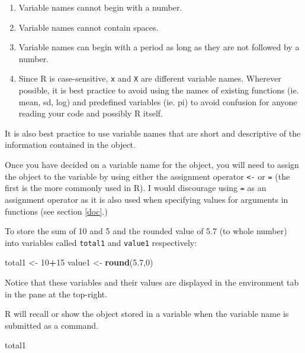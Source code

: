 \documentclass[
]{book}
\newenvironment{Shaded}{\begin{snugshade}}{\end{snugshade}}
\newcommand{\DecValTok}[1]{\textcolor[rgb]{0.00,0.00,0.81}{#1}}
\newcommand{\FloatTok}[1]{\textcolor[rgb]{0.00,0.00,0.81}{#1}}
\newcommand{\FunctionTok}[1]{\textcolor[rgb]{0.13,0.29,0.53}{\textbf{#1}}}
\newcommand{\NormalTok}[1]{#1}
\newcommand{\OtherTok}[1]{\textcolor[rgb]{0.56,0.35,0.01}{#1}}
\newcommand{\SpecialCharTok}[1]{\textcolor[rgb]{0.81,0.36,0.00}{\textbf{#1}}}
\providecommand{\tightlist}{%
  \setlength{\itemsep}{0pt}\setlength{\parskip}{0pt}}
\theoremstyle{definition}
\theoremstyle{definition}
\theoremstyle{definition}
\theoremstyle{definition}
\theoremstyle{remark}
\begin{document}
\begin{enumerate}
\def\labelenumi{\arabic{enumi}.}
\tightlist
\item
  Variable names cannot begin with a number.
\item
  Variable names cannot contain spaces.
\item
  Variable names can begin with a period as long as they are not followed by a number.
\item
  Since R is case-sensitive, \texttt{x} and \texttt{X} are different variable names.
  Wherever possible, it is best practice to avoid using the names of existing functions (ie. mean, sd, log) and predefined variables (ie. pi) to avoid confusion for anyone reading your code and possibly R itself.
\end{enumerate}

It is also best practice to use variable names that are short and descriptive of the information contained in the object.

Once you have decided on a variable name for the object, you will need to assign the object to the variable by using either the assignment operator \texttt{\textless{}-} or \texttt{=} (the first is the more commonly used in R). I would discourage using \texttt{=} as an assignment operator as it is also used when specifying values for arguments in functions (see section \ref{doc}.)

To store the sum of 10 and 5 and the rounded value of 5.7 (to whole number) into variables called \texttt{total1} and \texttt{value1} respectively:

\begin{Shaded}
\begin{Highlighting}[]
\NormalTok{total1 }\OtherTok{\textless{}{-}} \DecValTok{10}\SpecialCharTok{+}\DecValTok{15}
\NormalTok{value1 }\OtherTok{\textless{}{-}} \FunctionTok{round}\NormalTok{(}\FloatTok{5.7}\NormalTok{,}\DecValTok{0}\NormalTok{)}
\end{Highlighting}
\end{Shaded}

Notice that these variables and their values are displayed in the environment tab in the pane at the top-right.

R will recall or show the object stored in a variable when the variable name is submitted as a command.

\begin{Shaded}
\begin{Highlighting}[]
\NormalTok{total1}
\end{Highlighting}
\end{Shaded}
\end{document}
